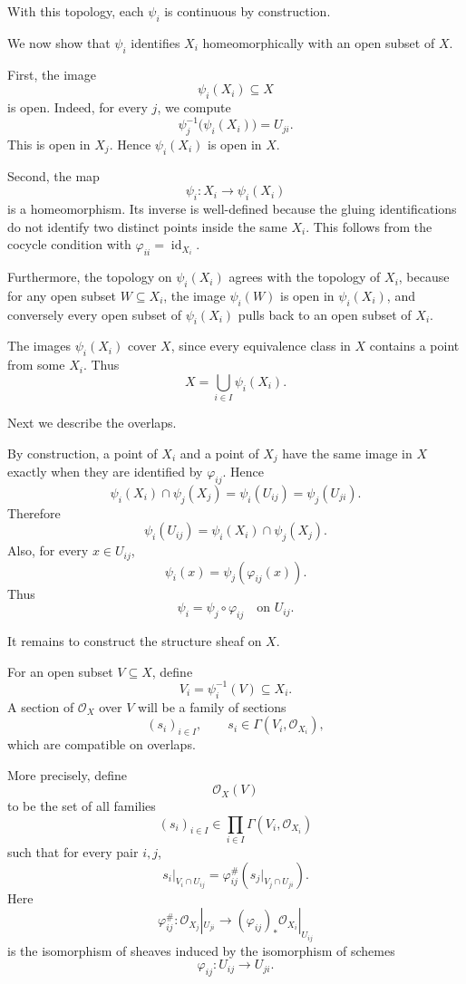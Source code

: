 \documentclass[12pt,a4paper]{article}
\theoremstyle{notespace}
\begin{document}
With this topology, each \(\psi_i\) is continuous by construction.

We now show that \(\psi_i\) identifies \(X_i\) homeomorphically with an open subset of \(X\).

First, the image
\[
\psi_i(X_i)\subseteq X
\]
is open. Indeed, for every \(j\), we compute
\[
\psi_j^{-1}\bigl(\psi_i(X_i)\bigr)=U_{ji}.
\]
This is open in \(X_j\). Hence \(\psi_i(X_i)\) is open in \(X\).

Second, the map
\[
\psi_i:X_i\to \psi_i(X_i)
\]
is a homeomorphism. Its inverse is well-defined because the gluing identifications do not identify two distinct points inside the same \(X_i\). This follows from the cocycle condition with \(\varphi_{ii}=\operatorname{id}_{X_i}\).

Furthermore, the topology on \(\psi_i(X_i)\) agrees with the topology of \(X_i\), because for any open subset \(W\subseteq X_i\), the image \(\psi_i(W)\) is open in \(\psi_i(X_i)\), and conversely every open subset of \(\psi_i(X_i)\) pulls back to an open subset of \(X_i\).

The images \(\psi_i(X_i)\) cover \(X\), since every equivalence class in \(X\) contains a point from some \(X_i\). Thus
\[
X=\bigcup_{i\in I}\psi_i(X_i).
\]

Next we describe the overlaps.

By construction, a point of \(X_i\) and a point of \(X_j\) have the same image in \(X\) exactly when they are identified by \(\varphi_{ij}\). Hence
\[
\psi_i(X_i)\cap \psi_j(X_j)
=
\psi_i(U_{ij})
=
\psi_j(U_{ji}).
\]
Therefore
\[
\boxed{
	\psi_i(U_{ij})
	=
	\psi_i(X_i)\cap \psi_j(X_j).
}
\]
Also, for every \(x\in U_{ij}\),
\[
\psi_i(x)
=
\psi_j(\varphi_{ij}(x)).
\]
Thus
\[
\boxed{
	\psi_i=\psi_j\circ\varphi_{ij}
	\quad\text{on }U_{ij}.
}
\]

It remains to construct the structure sheaf on \(X\).

For an open subset \(V\subseteq X\), define
\[
V_i=\psi_i^{-1}(V)\subseteq X_i.
\]
A section of \(\mathcal O_X\) over \(V\) will be a family of sections
\[
(s_i)_{i\in I},
\qquad
s_i\in \Gamma(V_i,\mathcal O_{X_i}),
\]
which are compatible on overlaps.

More precisely, define
\[
\mathcal O_X(V)
\]
to be the set of all families
\[
(s_i)_{i\in I}\in \prod_{i\in I}\Gamma(V_i,\mathcal O_{X_i})
\]
such that for every pair \(i,j\),
\[
s_i|_{V_i\cap U_{ij}}
=
\varphi_{ij}^{\#}
\left(
s_j|_{V_j\cap U_{ji}}
\right).
\]
Here
\[
\varphi_{ij}^{\#}:
\mathcal O_{X_j}|_{U_{ji}}
\longrightarrow
(\varphi_{ij})_*\mathcal O_{X_i}|_{U_{ij}}
\]
is the isomorphism of sheaves induced by the isomorphism of schemes
\[
\varphi_{ij}:U_{ij}\to U_{ji}.
\]
\end{document}
